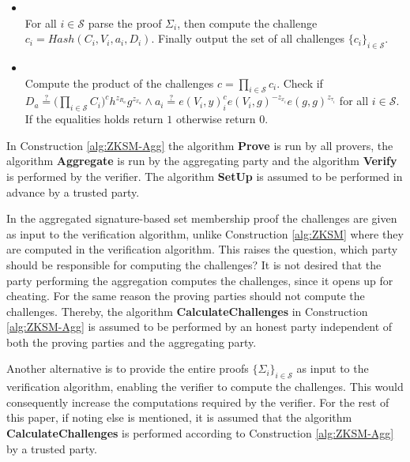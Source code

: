 \begin{algorithm}[]
\begin{itemize}
\item {}\\
For all $i\in\mathcal{S}$ parse the proof $\Sigma_i$, then compute the challenge $c_i = Hash(C_i,V_i,a_i,D_i)$. Finally output the set of all challenges $\{c_i\}_{i\in\mathcal{S}}$. 

\item{} \\
Compute the product of the challenges $c=\prod_{i\in\mathcal{S}} c_i$. Check if $D_a\overset{?}{=} \big( \prod_{i\in\mathcal{S}}C_i\big)^ch^{z_R_a}g^{z_x_a}\wedge a_i \overset{?}{=} e(V_i,y)^c_i e(V_i,g)^{-z_{x_i}}e(g,g)^{z_{\tau_i}}$ for all $i\in\mathcal{S}$. If the equalities holds return $1$ otherwise return $0$.
\end{itemize}
\label{alg:ZKSM-Agg}
\end{algorithm} 


In Construction \ref{alg:ZKSM-Agg} the algorithm \textbf{Prove} is run by all provers, the algorithm \textbf{Aggregate} is run by the aggregating party and the algorithm \textbf{Verify} is performed by the verifier. The algorithm \textbf{SetUp} is assumed to be performed in advance by a trusted party.

In the aggregated signature-based set membership proof the challenges are given as input to the verification algorithm, unlike Construction \ref{alg:ZKSM} where they are computed in the verification algorithm. This raises the question, which party should be responsible for computing the challenges?  It is not desired that the party performing the aggregation computes the challenges, since it opens up for cheating. For the same reason the proving parties  should not compute the challenges. Thereby, the algorithm \textbf{CalculateChallenges} in Construction \ref{alg:ZKSM-Agg} is assumed to be performed by an honest party independent of both the proving parties and the aggregating party. 

Another alternative is to provide the entire proofs $\{\Sigma_i\}_{i\in\mathcal{S}}$ as input to the verification algorithm, enabling the verifier to compute the challenges. This would consequently increase the computations required by the verifier. For the rest of this paper, if noting else is mentioned, it is assumed that the algorithm \textbf{CalculateChallenges} is performed according to Construction \ref{alg:ZKSM-Agg} by a trusted party. 

